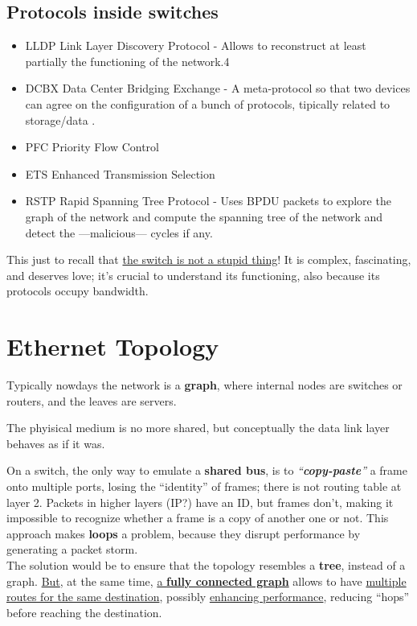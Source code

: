 \subsection{Protocols inside switches}
\begin{itemize}
   \item LLDP Link Layer Discovery Protocol - Allows to reconstruct at least partially the functioning of the network.4
   \item DCBX Data Center Bridging Exchange - A meta-protocol so that two devices can agree on the configuration of a bunch of protocols, tipically related to storage/data 
   .
   \item PFC Priority Flow Control
   \item ETS Enhanced Transmission Selection
   \item RSTP Rapid Spanning Tree Protocol - Uses BPDU packets to explore the graph of the network and compute the spanning tree of the network and detect the ---malicious--- cycles if any.
\end{itemize}

This just to recall that \ul{the switch is not a stupid thing}! It is complex, fascinating, and deserves love; it's crucial to understand its functioning, also because its protocols occupy bandwidth.

\section{Ethernet Topology}
Typically nowdays the network is a \textbf{graph}, where internal nodes are switches or routers, and the leaves are servers.

The phyisical medium is no more shared, but conceptually the data link layer behaves as if it was.

On a switch, the only way to emulate a \textbf{shared bus}, is to \textit{``\textbf{copy-paste}''} a frame onto multiple ports, losing the ``identity'' of frames; there is not routing table at layer 2. Packets in higher layers (IP?) have an ID, but frames don't, making it impossible to recognize whether a frame is a copy of another one or not.
This approach makes \textbf{loops} a problem, because they disrupt performance by generating a packet storm.\\
The solution would be to ensure that the topology resembles a \textbf{tree}, instead of a graph.
\ul{But}, at the same time, \ul{a \textbf{fully connected graph}} allows to have \ul{multiple routes for the same destination}, possibly \ul{enhancing performance}, reducing ``hops'' before reaching the destination.

